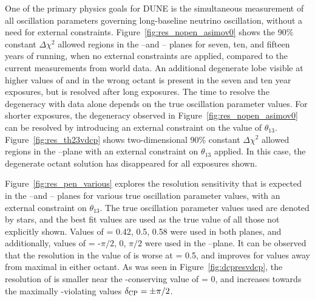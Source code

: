 One of the primary physics goals for DUNE is the simultaneous measurement of all oscillation parameters governing long-baseline neutrino oscillation, without a need for external constraints. Figure~\ref{fig:res_nopen_asimov0} shows the 90\% constant $\Delta\chi^{2}$ allowed regions in the --\deltacp and -- planes for seven, ten, and fifteen years of running, when no external constraints are applied, compared to the current measurements from world data. An additional degenerate lobe visible at higher values of  and in the wrong  octant is present in the seven and ten year exposures, but is resolved after long exposures. The time to resolve the degeneracy with  data alone depends on the true oscillation parameter values. For shorter exposures, the degeneracy observed in Figure~\ref{fig:res_nopen_asimov0} can be resolved by introducing an external constraint on the value of $\theta_{13}$. Figure~\ref{fig:res_th23vdcp} shows two-dimensional 90\% constant $\Delta\chi^{2}$ allowed regions in the --\deltacp plane with an external constraint on $\theta_{13}$ applied. In this case, the degenerate octant solution has disappeared for all exposures shown.

Figure~\ref{fig:res_pen_various} explores the resolution sensitivity that is expected in the --\deltacp and -- planes for various true oscillation parameter values, with an external constraint on $\theta_{13}$. The true oscillation parameter values used are denoted by stars, and the  best fit values are used as the true value of all those not explicitly shown. Values of  = 0.42, 0.5, 0.58 were used in both planes, and additionally, values of \deltacp = -$\pi/2$, 0, $\pi/2$ were used in the --\deltacp plane. It can be observed that the resolution in the value of  is worse at  = 0.5, and improves for values away from maximal in either octant. As was seen in Figure~\ref{fig:dcpresvdcp}, the resolution of \deltacp is smaller near the -conserving value of \deltacp = 0, and increases towards the maximally -violating values $\delta_{\rm CP} = \pm\pi/2$.

